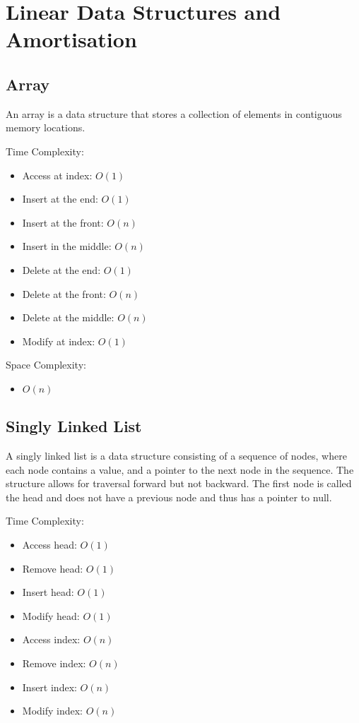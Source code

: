 \chapter{Linear Data Structures and Amortisation}

\section{Array}

An array is a data structure that stores a collection of elements in contiguous memory locations.

Time Complexity:
\begin{itemize}
  \item Access at index: $O(1)$
  \item Insert at the end: $O(1)$
  \item Insert at the front: $O(n)$
  \item Insert in the middle: $O(n)$
  \item Delete at the end: $O(1)$
  \item Delete at the front: $O(n)$
  \item Delete at the middle: $O(n)$
  \item Modify at index: $O(1)$
\end{itemize}

Space Complexity:
\begin{itemize}
    \item $O(n)$
\end{itemize}

\section{Singly Linked List}
A singly linked list is a data structure consisting of a sequence of nodes, where each node contains a value, and a pointer to the next node in the sequence. The structure allows for traversal forward but not backward. The first node is called the head and does not have a previous node and thus has a pointer to null.

Time Complexity:

\begin{itemize}
    \item Access head: $O(1)$
    \item Remove head: $O(1)$
    \item Insert head: $O(1)$
    \item Modify head: $O(1)$
    \item Access index: $O(n)$
    \item Remove index: $O(n)$
    \item Insert index: $O(n)$
    \item Modify index: $O(n)$
\end{itemize}

